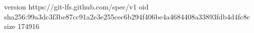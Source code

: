 version https://git-lfs.github.com/spec/v1
oid sha256:99a3dc3f3be87cc91a2e3e255cec6b294f406be4a4684408a33893fdb4d4fc8c
size 174916
